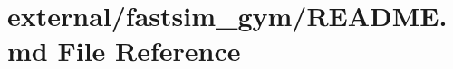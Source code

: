 \hypertarget{external_2fastsim__gym_2_r_e_a_d_m_e_8md}{}\section{external/fastsim\+\_\+gym/\+R\+E\+A\+D\+ME.md File Reference}
\label{external_2fastsim__gym_2_r_e_a_d_m_e_8md}
